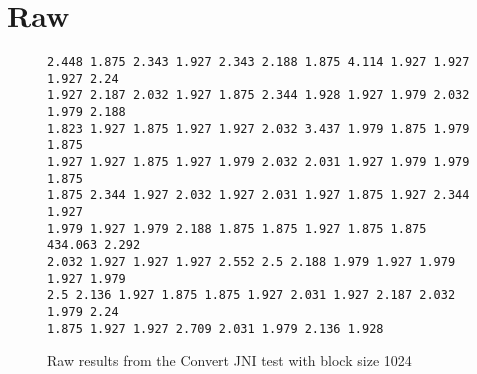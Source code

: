 %         
%         
%         
%         
%         
%         

\section{Raw}
\begin{figure}[H]
    \begin{verbatim}
2.448 1.875 2.343 1.927 2.343 2.188 1.875 4.114 1.927 1.927 1.927 2.24
1.927 2.187 2.032 1.927 1.875 2.344 1.928 1.927 1.979 2.032 1.979 2.188
1.823 1.927 1.875 1.927 1.927 2.032 3.437 1.979 1.875 1.979 1.875
1.927 1.927 1.875 1.927 1.979 2.032 2.031 1.927 1.979 1.979 1.875
1.875 2.344 1.927 2.032 1.927 2.031 1.927 1.875 1.927 2.344 1.927
1.979 1.927 1.979 2.188 1.875 1.875 1.927 1.875 1.875 434.063 2.292
2.032 1.927 1.927 1.927 2.552 2.5 2.188 1.979 1.927 1.979 1.927 1.979
2.5 2.136 1.927 1.875 1.875 1.927 2.031 1.927 2.187 2.032 1.979 2.24
1.875 1.927 1.927 2.709 2.031 1.979 2.136 1.928 
    \end{verbatim}
    \caption{Raw results from the Convert JNI test with block size 1024}
    \label{fig:raw:jni:convert:1024}
\end{figure}
